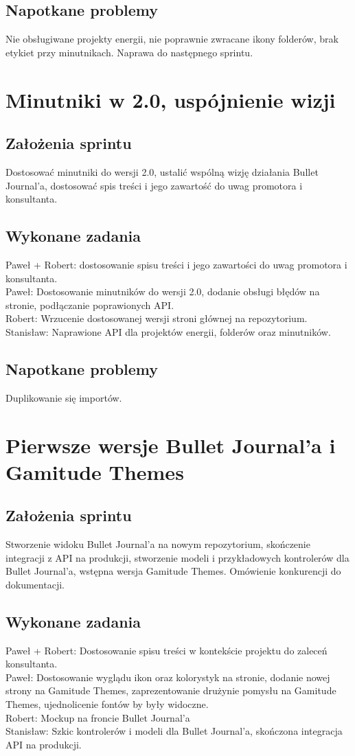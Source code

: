 \documentclass[a4paper,11pt]{report}
\begin{document}
\subsection {Napotkane problemy}
Nie obsługiwane projekty energii, nie poprawnie zwracane ikony folderów, brak etykiet przy minutnikach. Naprawa do następnego sprintu.

\section {Minutniki w 2.0, uspójnienie wizji}
\subsection {Założenia sprintu}
Dostosować minutniki do wersji 2.0, ustalić wspólną wizję działania Bullet Journal'a, dostosować spis treści i jego zawartość do uwag promotora i konsultanta.
\subsection {Wykonane zadania}
Paweł + Robert: dostosowanie spisu treści i jego zawartości do uwag promotora i konsultanta.\\
Paweł: Dostosowanie minutników do wersji 2.0, dodanie obsługi błędów na stronie, podłączanie poprawionych API.\\
Robert:  Wrzucenie dostosowanej wersji stroni głównej na repozytorium.\\
Stanisław: Naprawione API dla projektów energii, folderów oraz minutników.\\
\subsection {Napotkane problemy}
Duplikowanie się importów.

\section {Pierwsze wersje Bullet Journal'a i Gamitude Themes}
\label{sec:system_zarzadzania_dziennikami}
\subsection {Założenia sprintu}
Stworzenie widoku Bullet Journal'a na nowym repozytorium, skończenie integracji z API na produkcji, stworzenie modeli i przykładowych kontrolerów dla Bullet Journal'a, wstępna wersja Gamitude Themes. Omówienie konkurencji do dokumentacji.
\subsection {Wykonane zadania}
Paweł + Robert: Dostosowanie spisu treści w kontekście projektu do zaleceń konsultanta.\\
Paweł: Dostosowanie wyglądu ikon oraz kolorystyk na stronie, dodanie nowej strony na Gamitude Themes, zaprezentowanie drużynie pomysłu na Gamitude Themes, ujednolicenie fontów by były widoczne.\\
Robert: Mockup na froncie Bullet Journal'a\\
Stanisław: Szkic kontrolerów i modeli dla Bullet Journal'a, skończona integracja API na produkcji.\\
\end{document}
